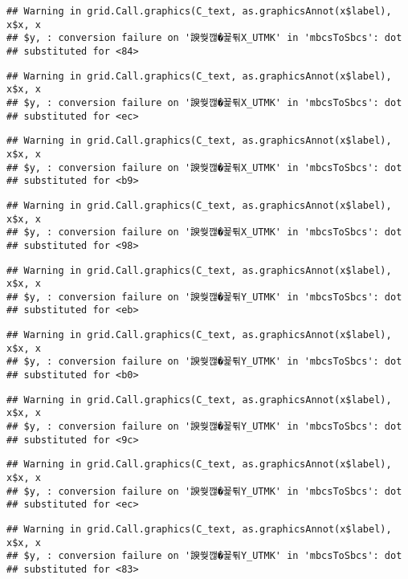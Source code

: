 \documentclass[]{article}
\begin{document}
\begin{verbatim}
## Warning in grid.Call.graphics(C_text, as.graphicsAnnot(x$label), x$x, x
## $y, : conversion failure on '諛쒖깮�꾩튂X_UTMK' in 'mbcsToSbcs': dot
## substituted for <84>
\end{verbatim}

\begin{verbatim}
## Warning in grid.Call.graphics(C_text, as.graphicsAnnot(x$label), x$x, x
## $y, : conversion failure on '諛쒖깮�꾩튂X_UTMK' in 'mbcsToSbcs': dot
## substituted for <ec>
\end{verbatim}

\begin{verbatim}
## Warning in grid.Call.graphics(C_text, as.graphicsAnnot(x$label), x$x, x
## $y, : conversion failure on '諛쒖깮�꾩튂X_UTMK' in 'mbcsToSbcs': dot
## substituted for <b9>
\end{verbatim}

\begin{verbatim}
## Warning in grid.Call.graphics(C_text, as.graphicsAnnot(x$label), x$x, x
## $y, : conversion failure on '諛쒖깮�꾩튂X_UTMK' in 'mbcsToSbcs': dot
## substituted for <98>
\end{verbatim}

\begin{verbatim}
## Warning in grid.Call.graphics(C_text, as.graphicsAnnot(x$label), x$x, x
## $y, : conversion failure on '諛쒖깮�꾩튂Y_UTMK' in 'mbcsToSbcs': dot
## substituted for <eb>
\end{verbatim}

\begin{verbatim}
## Warning in grid.Call.graphics(C_text, as.graphicsAnnot(x$label), x$x, x
## $y, : conversion failure on '諛쒖깮�꾩튂Y_UTMK' in 'mbcsToSbcs': dot
## substituted for <b0>
\end{verbatim}

\begin{verbatim}
## Warning in grid.Call.graphics(C_text, as.graphicsAnnot(x$label), x$x, x
## $y, : conversion failure on '諛쒖깮�꾩튂Y_UTMK' in 'mbcsToSbcs': dot
## substituted for <9c>
\end{verbatim}

\begin{verbatim}
## Warning in grid.Call.graphics(C_text, as.graphicsAnnot(x$label), x$x, x
## $y, : conversion failure on '諛쒖깮�꾩튂Y_UTMK' in 'mbcsToSbcs': dot
## substituted for <ec>
\end{verbatim}

\begin{verbatim}
## Warning in grid.Call.graphics(C_text, as.graphicsAnnot(x$label), x$x, x
## $y, : conversion failure on '諛쒖깮�꾩튂Y_UTMK' in 'mbcsToSbcs': dot
## substituted for <83>
\end{verbatim}
\end{document}
